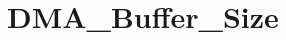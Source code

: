 \hypertarget{group___d_m_a___buffer___size}{\section{D\-M\-A\-\_\-\-Buffer\-\_\-\-Size}
\label{group___d_m_a___buffer___size}
}
